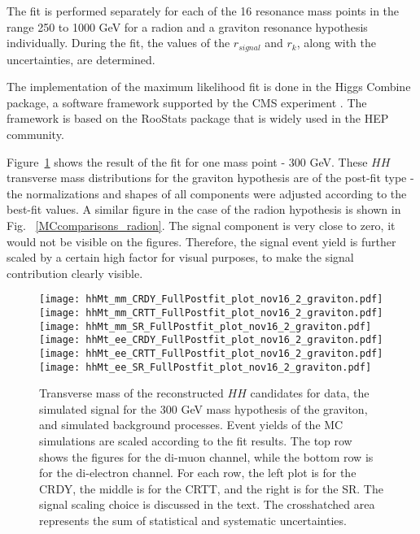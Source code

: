 The fit is performed separately for each of the 16 resonance mass points in the range 250 to 1000 GeV for a radion and a graviton resonance hypothesis individually. During the fit, the values of the $r_{signal}$ and $r_k$, along with the uncertainties, are determined. 

The implementation of the maximum likelihood fit is done in the Higgs Combine package, a software framework supported by the CMS experiment \cite{HiggsCombine}. The framework is based on the RooStats package \cite{RooStats} that is widely used in the HEP community. 

Figure~\ref{MCcomparisons} shows the result of the fit for one mass point - 300 GeV. These $HH$ transverse mass distributions for the graviton hypothesis are of the post-fit type - the normalizations and shapes of all components were adjusted according to the best-fit values. A similar figure in the case of the radion hypothesis is shown in Fig. ~\ref{MCcomparisons_radion}. The signal component is very close to zero, it would not be visible on the figures. Therefore, the signal event yield is further scaled by a certain high factor for visual purposes, to make the signal contribution clearly visible. 

\begin{figure}[H]
\begin{center}
\texttt{[image: hhMt\_mm\_CRDY\_FullPostfit\_plot\_nov16\_2\_graviton.pdf]}
\texttt{[image: hhMt\_mm\_CRTT\_FullPostfit\_plot\_nov16\_2\_graviton.pdf]}
\texttt{[image: hhMt\_mm\_SR\_FullPostfit\_plot\_nov16\_2\_graviton.pdf]} \\
\texttt{[image: hhMt\_ee\_CRDY\_FullPostfit\_plot\_nov16\_2\_graviton.pdf]}
\texttt{[image: hhMt\_ee\_CRTT\_FullPostfit\_plot\_nov16\_2\_graviton.pdf]}
\texttt{[image: hhMt\_ee\_SR\_FullPostfit\_plot\_nov16\_2\_graviton.pdf]}
\caption[Transverse mass of the reconstructed $HH$ candidates for graviton hypothesis.]{Transverse mass of the reconstructed $HH$ candidates for data, the simulated signal for the 300 GeV mass hypothesis of the graviton, and simulated background processes. Event yields of the MC simulations are scaled according to the fit results. The top row shows the figures for the di-muon channel, while the bottom row is for the di-electron channel. For each row, the left plot is for the CRDY, the middle is for the CRTT, and the right is for the SR. The signal scaling choice is discussed in the text. The crosshatched area represents the sum of statistical and systematic uncertainties.
\label{MCcomparisons} } 
\end{center}
\end{figure}

